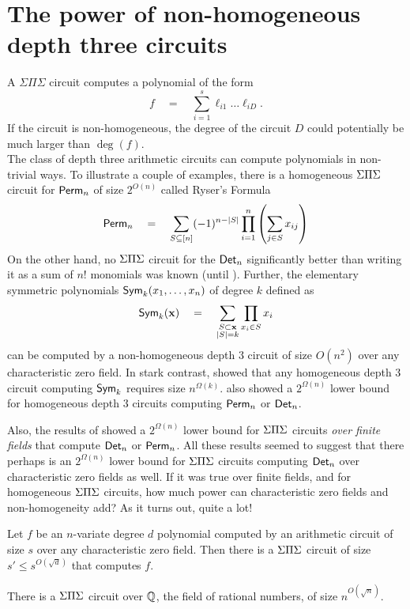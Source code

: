 \chapter{The power of non-homogeneous depth three circuits}
\label{chap:d3nonhom}
A $\Sigma\Pi\Sigma$ circuit computes a polynomial of the form
\[
f\quad=\quad \sum_{i=1}^s \ell_{i1}\dots \ell_{iD}.
\]
If the circuit is non-homogeneous, the degree of the circuit $D$ could potentially be much larger than $\deg(f)$. \\

The class of depth three arithmetic circuits can compute polynomials
in non-trivial ways.
To illustrate a couple of examples, there is a homogeneous $\Sigma\Pi\Sigma$
circuit for $\operatorname{\mathsf{Perm}}_n$ of size $2^{O(n)}$ called Ryser's Formula
\cite{rys63}
\begin{equation}\label{eqn:ryser}
\operatorname{\mathsf{Perm}}_n \quad = \quad \sum_{S \subseteq[n]} (-1)^{n - |S|} \prod_{i=1}^n \left(\sum_{j\in S} x_{ij}\right)
\end{equation}
On the other hand, no $\Sigma\Pi\Sigma$ circuit for the $\operatorname{\mathsf{Det}}_n$ significantly
better than writing it as a sum of $n!$ monomials was known (until
\cite{gkks13b}). 
Further, the elementary symmetric polynomials $\operatorname{\mathsf{Sym}}_k(x_1,\dots,
x_n)$ of degree $k$ defined as
\[
\operatorname{\mathsf{Sym}}_k(\mathbf{x}) \quad = \quad \sum_{\substack{S\subset \mathbf{x}\\|S| = k}} \prod_{x_i\in S}x_i
\]
can be computed by a non-homogeneous depth $3$ circuit of size
$O(n^2)$ over any characteristic zero field.
In stark contrast, \cite{nw1997} showed that any homogeneous depth $3$
circuit computing $\operatorname{\mathsf{Sym}}_k$ requires size
$n^{\Omega(k)}$. \cite{nw1997} also showed a $2^{\Omega(n)}$ lower
bound for homogeneous depth $3$ circuits computing $\operatorname{\mathsf{Perm}}_n$ or
$\operatorname{\mathsf{Det}}_n$. 

Also, the results of \cite{gr00,grigoriev98} showed a $2^{\Omega(n)}$
lower bound for $\Sigma\Pi\Sigma$ circuits \emph{over finite fields} that compute
$\operatorname{\mathsf{Det}}_n$ or $\operatorname{\mathsf{Perm}}_n$.
All these results seemed to suggest that there perhaps is an
$2^{\Omega(n)}$ lower bound for $\Sigma\Pi\Sigma$ circuits computing $\operatorname{\mathsf{Det}}_n$
over characteristic zero fields as well.
If it was true over finite fields, and for homogeneous $\Sigma\Pi\Sigma$
circuits, how much power can characteristic zero fields and
non-homogeneity add? 
As it turns out, quite a lot!

\begin{theorem} \label{thm:chasm-at-3} Let $f$ be an
  $n$-variate degree $d$ polynomial computed by an arithmetic circuit
  of size $s$ over any characteristic zero field.
  Then there is a $\Sigma\Pi\Sigma$ circuit of size $s' \leq s^{O(\sqrt{d})}$
  that computes $f$. 
\end{theorem}
\begin{corollary}\label{cor:det-sps}
There is a $\Sigma\Pi\Sigma$ circuit over $\mathbb{Q}$, the field of rational numbers, of size $n^{O(\sqrt{n})}$. 
\end{corollary}


